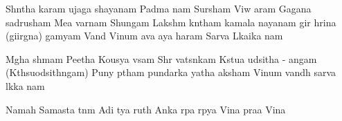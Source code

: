 \documentclass[20pt]{article}
\begin{document}
\novspace
\SlokaHuge
{Sh{\A}ntha {\aaa}karam {\Bh}ujaga shayanam}
{Padma n{\aaa}{\bh}am Sur{\e}sham}
{Vi{\sh}w{\A} {\aaa}{\dH}aram Gagana sadrusham}
{Me{\gh}a varnam Shu{\bh}{\A}ngam}
{}
{Lakshm{\ii} k{\aaa}ntham kamala nayanam}
{{\Yo}gir hri{\dH}{\ya}na ({\Yo}gi{\bh}irg{\ya}na) gamyam}
{Vand{\e} Vi{\sh}num {\Bh}ava {\Bh}aya haram}
{Sarva L{\oh}kaika n{\A}{\tH}am}

\SlokaHuge
{M{\e}gha sh{\ya}mam Peetha Kous{\he}ya v{\A}sam}
{Shr{\ee} vats{\A}nkam}
{K{\ou}stu{\bh}a \dsh ud{\bh}{\A}sitha - angam}
{(K{\ou}thsu{\bh}od{\bh}{\A}sith{\A}ngam)}
{}
{Puny{\oh} p{\e}tham pundar{\ee}ka {\A}yatha aksham}
{Vi{\sh}num vandh{\e} sarva l{\oh}k{\ai}ka n{\A}{\tH}am}

\newpage
\SlokaHuge
{Namah Samasta {\Bh}{\oo}t{\A}n{\A}m}
{Adi {\Bh}{\oo}t{\A}ya {\Bh}{\oo} {\Bh}ruth{\e}}
{An{\e}ka r{\oo}pa r{\oo}p{\A}ya}
{Vi{\sh}na{\ve} pra{\bh}a Vi{\sh}na{\ve}}

\end{document}
